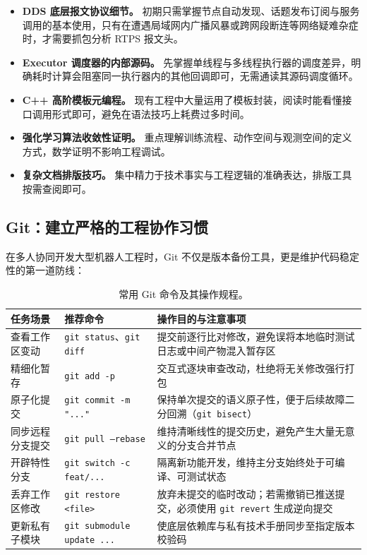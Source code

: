 \begin{itemize}[leftmargin=*]
    \item \textbf{DDS 底层报文协议细节。} 初期只需掌握节点自动发现、话题发布订阅与服务调用的基本使用，只有在遭遇局域网内广播风暴或跨网段断连等网络疑难杂症时，才需要抓包分析 RTPS 报文头。
    \item \textbf{Executor 调度器的内部源码。} 先掌握单线程与多线程执行器的调度差异，明确耗时计算会阻塞同一执行器内的其他回调即可，无需通读其源码调度循环。
    \item \textbf{C++ 高阶模板元编程。} 现有工程中大量运用了模板封装，阅读时能看懂接口调用形式即可，避免在语法技巧上耗费过多时间。
    \item \textbf{强化学习算法收敛性证明。} 重点理解训练流程、动作空间与观测空间的定义方式，数学证明不影响工程调试。
    \item \textbf{复杂文档排版技巧。} 集中精力于技术事实与工程逻辑的准确表达，排版工具按需查阅即可。
\end{itemize}

\subsection{Git：建立严格的工程协作习惯}

在多人协同开发大型机器人工程时，Git 不仅是版本备份工具，更是维护代码稳定性的第一道防线：

\begin{table}[H]
\centering
\small
\begin{tabularx}{\textwidth}{p{3.2cm} p{4.6cm} X}
\toprule
\textbf{任务场景} & \textbf{推荐命令} & \textbf{操作目的与注意事项} \\
\midrule
查看工作区变动 & \texttt{git status}、\texttt{git diff} & 提交前逐行比对修改，避免误将本地临时测试日志或中间产物混入暂存区 \\
\addlinespace
精细化暂存 & \texttt{git add -p} & 交互式逐块审查改动，杜绝将无关修改强行打包 \\
\addlinespace
原子化提交 & \texttt{git commit -m "..."} & 保持单次提交的语义原子性，便于后续故障二分回溯（\texttt{git bisect}） \\
\addlinespace
同步远程分支提交 & \texttt{git pull --rebase} & 维持清晰线性的提交历史，避免产生大量无意义的分支合并节点 \\
\addlinespace
开辟特性分支 & \texttt{git switch -c feat/...} & 隔离新功能开发，维持主分支始终处于可编译、可测试状态 \\
\addlinespace
丢弃工作区修改 & \texttt{git restore <file>} & 放弃未提交的临时改动；若需撤销已推送提交，必须使用 \texttt{git revert} 生成逆向提交 \\
\addlinespace
更新私有子模块 & \texttt{git submodule update ...} & 使底层依赖库与私有技术手册同步至指定版本校验码 \\
\bottomrule
\end{tabularx}
\caption{常用 Git 命令及其操作规程。}
\end{table}

